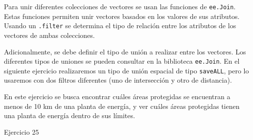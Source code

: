 \documentclass[
  12pt,
  letterpaper,
  twoside]{book}
\begin{document}
Para unir diferentes colecciones de vectores se usan las funciones de \texttt{ee.Join}. Estas funciones permiten unir vectores basados en los valores de sus atributos. Usando un \texttt{.filter} se determina el tipo de relación entre los atributos de los vectores de ambas colecciones.

Adicionalmente, se debe definir el tipo de unión a realizar entre los vectores. Los diferentes tipos de uniones se pueden consultar en la biblioteca \texttt{ee.Join}. En el siguiente ejercicio realizaremos un tipo de unión espacial de tipo \texttt{saveALL}, pero lo usaremos con dos filtros diferentes (uno de intersección y otro de distancia).

En este ejercicio se busca encontrar cuáles áreas protegidas se encuentran a menos de 10 km de una planta de energía, y ver cuáles áreas protegidas tienen una planta de energía dentro de sus límites.

Ejercicio 25
\end{document}

